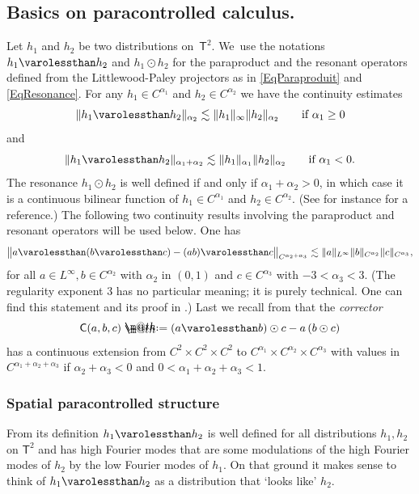 \documentclass[JEP,XML,SOM,Unicode,published]{cedram}
\makeatletter
\theoremstyle{definition}
\newcommand{\bsfT}{\mathbf{\mathsf{T}}}
\newcommand*{\defeq}{\mathrel{\rlap{%
\raisebox{0.3ex}{$\m@th\cdot$}}%
\raisebox{-0.3ex}{$\m@th\cdot$}}%
=}
\makeatother
\begin{document}
\subsection{Basics on paracontrolled calculus. }
\label{SubsectionBasics}

Let $h_1$ and $h_2$ be two distributions on~$\bsfT^2$. We~use the notations $h_1\varolessthan h_2$ and $h_1\odot h_2$ for the paraproduct and the resonant operators defined from the Littlewood-Paley projectors as in \eqref{EqParaproduit} and \eqref{EqResonance}. For any $h_1\in C^{\alpha_1}$ and $h_2\in C^{\alpha_2}$ we have the continuity estimates
\[
\Vert h_1\varolessthan h_2 \Vert_{\alpha_2} \lesssim \Vert h_1\Vert_\infty \Vert h_2\Vert_{\alpha_2} \qquad \textrm{if $\alpha_1\geq 0$}
\]
and
\[
\Vert h_1\varolessthan h_2 \Vert_{\alpha_1+\alpha_2} \lesssim \Vert h_1\Vert_{\alpha_1} \Vert h_2\Vert_{\alpha_2} \qquad \textrm{if $\alpha_1<0$}.
\]
The resonance $h_1\odot h_2$ is well defined if and only if $\alpha_1+\alpha_2>0$, in which case it is a continuous bilinear function of $h_1\in C^{\alpha_1}$ and $h_2\in C^{\alpha_2}$. (See for instance \cite[\S2.6]{BCD} for a reference.) The following two continuity results involving the paraproduct and resonant operators will be used below. One has
\begin{equation} \label{EqRContinuity}
\big\Vert a \varolessthan (b \varolessthan c) - (ab) \varolessthan c \big\Vert_{C^{\alpha_2+\alpha_3}} \lesssim \Vert a\Vert_{L^\infty} \Vert b\Vert_{C^{\alpha_2}} \Vert c\Vert_{C^{\alpha_3}},
\end{equation}
for all $a\in L^\infty, b\in C^{\alpha_2}$ with $\alpha_2$ in $(0,1)$ and $c\in C^{\alpha_3}$ with $-3<\alpha_3<3$. (The regularity exponent $3$ has no particular meaning; it is purely technical. One can find this statement and its proof in \cite[Prop.\,14]{BailleulBernicotHighOrder}.) Last we recall from \cite[Lem.\,2.4]{GIP} that the {\it corrector}
\[
\mathsf{C}(a,b,c) \defeq (a\varolessthan b)\odot c - a \, (b\odot c)
\]
has a continuous extension from $C^2\times C^2\times C^2$ to $C^{\alpha_1}\times C^{\alpha_2}\times C^{\alpha_3}$ with values in $C^{\alpha_1+\alpha_2+\alpha_3}$ if $\alpha_2+\alpha_3<0$ and $0<\alpha_1+\alpha_2+\alpha_3<1$.

\subsubsection{Spatial paracontrolled structure} From its definition $h_1 \varolessthan h_2$ is well defined for all distributions $h_1,h_2$ on $\bsfT^2$ and has high Fourier modes that are some modulations of the high Fourier modes of $h_2$ by the low Fourier modes of $h_1$. On that ground it makes sense to think of $h_1\varolessthan h_2$ as a distribution that `looks like' $h_2$.
\end{document}
